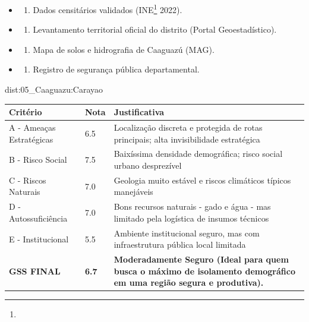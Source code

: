 {\begin{itemize}
\tightlist
\item
  \begin{enumerate}
  \def\labelenumi{\arabic{enumi})}
  \tightlist
  \item
    Dados censitários validados (INE\footnote{\fineINE} 2022).
  \end{enumerate}
\item
  \begin{enumerate}
  \def\labelenumi{\arabic{enumi})}
  \setcounter{enumi}{1}
  \tightlist
  \item
    Levantamento territorial oficial do distrito (Portal
    Geoestadístico).
  \end{enumerate}
\item
  \begin{enumerate}
  \def\labelenumi{\arabic{enumi})}
  \setcounter{enumi}{2}
  \tightlist
  \item
    Mapa de solos e hidrografia de Caaguazú (MAG).
  \end{enumerate}
\item
  \begin{enumerate}
  \def\labelenumi{\arabic{enumi})}
  \setcounter{enumi}{3}
  \tightlist
  \item
    Registro de segurança pública departamental.
  \end{enumerate}
\end{itemize}}{dist:05_Caaguazu:Carayao}
\begin{table}[ht!]
\small \begin{tabular}{p{3.0cm}p{0.8cm}p{6.0cm}} \toprule
\textbf{Critério} & \textbf{Nota} & \textbf{Justificativa} \\ \midrule
A - Ameaças Estratégicas & 6.5 & Localização discreta e protegida de rotas principais; alta invisibilidade estratégica \\
B - Risco Social & 7.5 & Baixíssima densidade demográfica; risco social urbano desprezível \\
C - Riscos Naturais & 7.0 & Geologia muito estável e riscos climáticos típicos manejáveis \\
D - Autossuficiência & 7.0 & Bons recursos naturais - gado e água - mas limitado pela logística de insumos técnicos \\
E - Institucional & 5.5 & Ambiente institucional seguro, mas com infraestrutura pública local limitada \\
\midrule \textbf{GSS FINAL} & \textbf{6.7} & \textbf{Moderadamente Seguro (Ideal para quem busca o máximo de isolamento demográfico em uma região segura e produtiva).} \\ \bottomrule \end{tabular}
\end{table}
